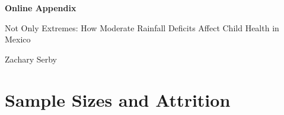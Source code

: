 \documentclass[12pt]{article}
\begin{document}
\begin{center}
{\LARGE\bfseries Online Appendix\par}
\vspace{0.15in}
{\large Not Only Extremes: How Moderate Rainfall Deficits Affect Child Health in Mexico\par}
\vspace{0.1in}
{\large Zachary Serby\par}
\end{center}
\vspace{0.2in}
\renewcommand{\contentsname}{Table of Contents for Online Appendix}
\setcounter{tocdepth}{1}
\tableofcontents
\clearpage
\setcounter{table}{0}
\setcounter{figure}{0}
\renewcommand{\thetable}{OA\arabic{table}}
\renewcommand{\thefigure}{OA\arabic{figure}}
\renewcommand{\thesection}{\Alph{section}}

\section{Sample Sizes and Attrition}
\end{document}
